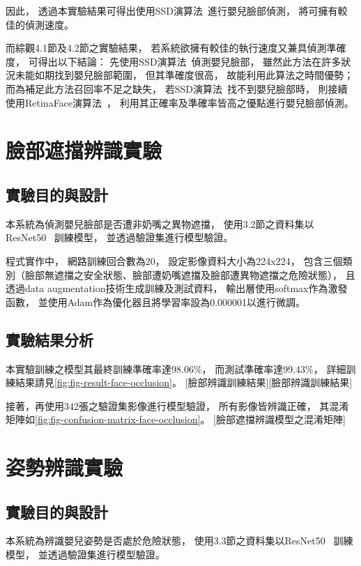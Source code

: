 \documentclass[class=NCU_thesis, crop=false]{standalone}
\begin{document}
因此，
透過本實驗結果可得出使用SSD演算法~\cite{ye_face_2021}進行嬰兒臉部偵測，
將可擁有較佳的偵測速度。

而綜觀4.1節及4.2節之實驗結果，
若系統欲擁有較佳的執行速度又兼具偵測準確度，
可得出以下結論：
先使用SSD演算法~\cite{ye_face_2021}偵測嬰兒臉部，
雖然此方法在許多狀況未能如期找到嬰兒臉部範圍，
但其準確度很高，
故能利用此算法之時間優勢；
而為補足此方法召回率不足之缺失，
若SSD演算法~\cite{ye_face_2021}找不到嬰兒臉部時，
則接續使用RetinaFace演算法~\cite{deng_retinaface_2020}，
利用其正確率及準確率皆高之優點進行嬰兒臉部偵測。

\section{臉部遮擋辨識實驗}
\subsection{實驗目的與設計}
本系統為偵測嬰兒臉部是否遭非奶嘴之異物遮擋，
使用3.2節之資料集以ResNet50~\cite{he_deep_2016}
訓練模型，
並透過驗證集進行模型驗證。

程式實作中，
網路訓練回合數為20，
設定影像資料大小為224x224，
包含三個類別（臉部無遮擋之安全狀態、臉部遭奶嘴遮擋及臉部遭異物遮擋之危險狀態），
且透過data augmentation技術生成訓練及測試資料，
輸出層使用softmax作為激發函數，
並使用Adam作為優化器且將學習率設為0.000001以進行微調。

\subsection{實驗結果分析}
本實驗訓練之模型其最終訓練準確率達98.06\%，
而測試準確率達99.43\%，
詳細訓練結果請見\cref{fig:fig-result-face-occlusion}。
[臉部辨識訓練結果][臉部辨識訓練結果]

接著，再使用342張之驗證集影像進行模型驗證，
所有影像皆辨識正確，
其混淆矩陣如\cref{fig:fig-confusion-matrix-face-occlusion}。
[臉部遮擋辨識模型之混淆矩陣]

\section{姿勢辨識實驗}
\subsection{實驗目的與設計}
本系統為辨識嬰兒姿勢是否處於危險狀態，
使用3.3節之資料集以ResNet50~\cite{he_deep_2016}
訓練模型，
並透過驗證集進行模型驗證。
\end{document}

